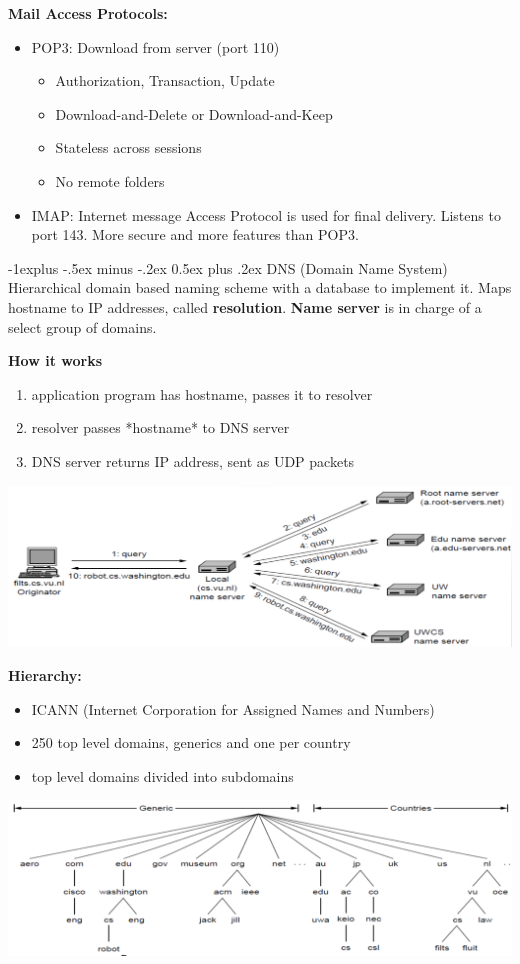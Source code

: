 \documentclass[letterpaper, 8pt]{extarticle}
\makeatletter
\renewcommand{\subsection}{\@startsection{subsection}{2}{0mm}%
                                {-1explus -.5ex minus -.2ex}%
                                {0.5ex plus .2ex}%
                                {\normalfont\small\bfseries}}
\makeatother
\begin{document}
\begin{multicols*}{4}
	\textbf{Mail Access Protocols:}
	\begin{itemize}
		\item POP3: Download from server (port 110)
		      \begin{itemize}
			      \item Authorization, Transaction, Update
			      \item Download-and-Delete or Download-and-Keep
			      \item Stateless across sessions
			      \item No remote folders
		      \end{itemize}
		\item IMAP: Internet message Access Protocol is used for final delivery. Listens to port 143. More secure and more features than POP3.
	\end{itemize}

	\subsection{DNS (Domain Name System)}
	Hierarchical domain based naming scheme with a database to implement it. Maps hostname to IP addresses, called \textbf{resolution}. \textbf{Name server} is in charge of a select group of domains.

	\textbf{How it works}
	\begin{enumerate}
		\item application program has hostname, passes it to resolver
		\item resolver passes *hostname* to DNS server
		\item DNS server returns IP address, sent as UDP packets
	\end{enumerate}
	\includegraphics[width=\linewidth]{SCR-20250417-brck.png}

	\textbf{Hierarchy:}
	\begin{itemize}
		\item ICANN (Internet Corporation for Assigned Names and Numbers)
		\item 250 top level domains, generics and one per country
		\item top level domains divided into subdomains
	\end{itemize}
	\includegraphics[width=\linewidth]{SCR-20250417-bplh.png}


\end{multicols*}
\end{document}
